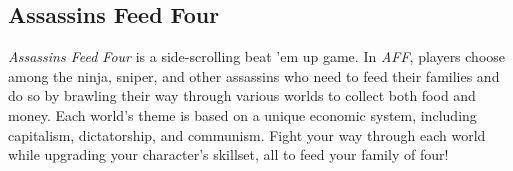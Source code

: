 \documentclass[12pt]{article}
\begin{document}
\subsection*{Assassins Feed Four}

{\it Assassins Feed Four} is a side-scrolling beat 'em up game. In {\it AFF},
players choose among the ninja, sniper, and other assassins who need to feed
their families and do so by brawling their way through various worlds to collect
both food and money. Each world's theme is based on a unique economic system,
including capitalism, dictatorship, and communism. Fight your way through each
world while upgrading your character's skillset, all to feed your family of
four!
\end{document}
